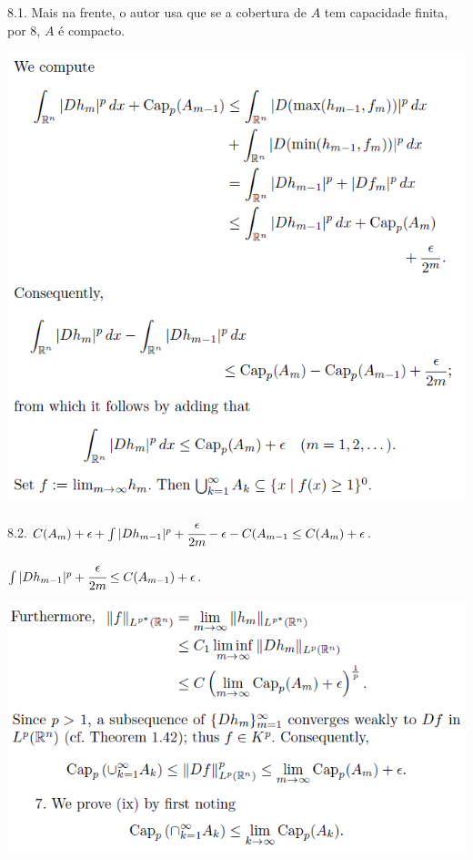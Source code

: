 \documentclass[12pt]{article}
\begin{document}
8.1. Mais na frente, o autor usa que se a cobertura de $A$ tem capacidade finita, por 8, $A$ \'e compacto.

\vspace{300mm}

		\begin{center}
		\includegraphics[scale=.9]{15}
		\end{center}

8.2. $C(A_m) + \epsilon + \int |Dh_{m-1}|^p + \cfrac{\epsilon}{2m} - \epsilon - C(A_{m - 1} \le C(A_m) + \epsilon$.

$\int |Dh_{m-1}|^p + \cfrac{\epsilon}{2m} \le C(A_{m - 1}) + \epsilon$.

\vspace{300mm}

		\begin{center}
		\includegraphics{16}
		\end{center}
\end{document}
